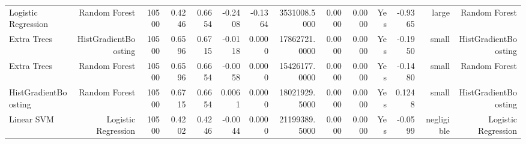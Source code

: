 \begin{landscape}
\begin{table}[htbp]
{\begin{tabular}{lrrrrrrrrrrrrr}
Logistic Regression & Random Forest & 10500 & 0.4246 & 0.6654 & -0.2408 & -0.1364 & 3531008.5000 & 0.0000 & 0.0000 & Yes & -0.9365 & large & Random Forest \\
Extra Trees & HistGradientBoosting & 10500 & 0.6596 & 0.6715 & -0.0118 & 0.0000 & 17862721.0000 & 0.0000 & 0.0000 & Yes & -0.1950 & small & HistGradientBoosting \\
Extra Trees & Random Forest & 10500 & 0.6596 & 0.6654 & -0.0058 & 0.0000 & 15426177.0000 & 0.0000 & 0.0000 & Yes & -0.1480 & small & Random Forest \\
HistGradientBoosting & Random Forest & 10500 & 0.6715 & 0.6654 & 0.0061 & 0.0000 & 18021929.5000 & 0.0000 & 0.0000 & Yes & 0.1248 & small & HistGradientBoosting \\
Linear SVM & Logistic Regression & 10500 & 0.4202 & 0.4246 & -0.0044 & 0.0000 & 21199389.5000 & 0.0000 & 0.0000 & Yes & -0.0599 & negligible & Logistic Regression \\
\bottomrule
\end{tabular}%
}
\end{table}
\end{landscape}
